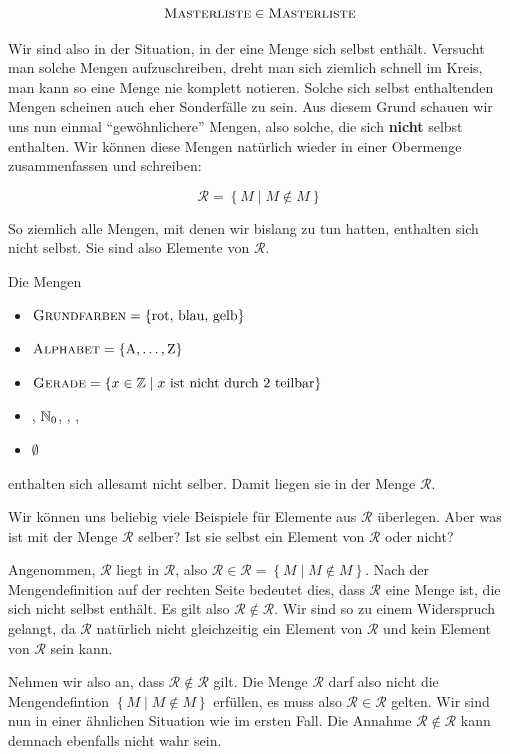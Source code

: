 \documentclass[../../main.tex]{subfiles}
\newcommand{\R}{\ensuremath{\mathcal{R}}\xspace}
\begin{document}
$$\textsc{Masterliste} \in \textsc{Masterliste}$$


Wir sind also in der Situation, in der eine Menge sich selbst enthält. Versucht man solche Mengen aufzuschreiben, dreht man sich ziemlich schnell im Kreis, man kann so eine Menge nie komplett notieren. Solche sich selbst enthaltenden Mengen scheinen auch eher Sonderfälle zu sein. Aus diesem Grund schauen wir uns nun einmal \enquote{gewöhnlichere} Mengen, also solche, die sich \textbf{nicht} selbst enthalten. Wir können diese Mengen natürlich wieder in einer Obermenge zusammenfassen und schreiben:

$$\R = \left\{ M \mid M \notin M \right\}$$

So ziemlich alle Mengen, mit denen wir bislang zu tun hatten, enthalten sich nicht selbst. Sie sind also Elemente von \R.

\begin{example}{}
	Die Mengen
	\begin{itemize}
		\item $\textsc{Grundfarben} = \left\{\text{rot, blau, gelb}\right\}$
		\item $\textsc{Alphabet} = \left\{\text{A},\ldots,\text{Z}\right\}$
		\item $\textsc{Gerade} = \left\{x \in \mathbb{Z} \mid x \text{ ist nicht durch 2 teilbar}\right\}$
		\item \Natural, $\mathbb{N}_0$, \Integer, \Rational, \Real
		\item $\emptyset$
	\end{itemize}
	enthalten sich allesamt nicht selber. Damit liegen sie in der Menge \R.
\end{example}

Wir können uns beliebig viele Beispiele für Elemente aus \R überlegen. Aber was ist mit der Menge \R selber? Ist sie selbst ein Element von \R oder nicht?

Angenommen, \R liegt in \R, also $\R \in \R = \left\{ M \mid M \notin M \right\}$. Nach der Mengendefinition auf der rechten Seite bedeutet dies, dass \R eine Menge ist, die sich nicht selbst enthält. Es gilt also $\R \notin \R$. Wir sind so zu einem Widerspruch gelangt, da \R natürlich nicht gleichzeitig ein Element von \R und kein Element von \R sein kann.

Nehmen wir also an, dass $\R \notin \R$ gilt. Die Menge \R darf also nicht die Mengendefintion $\left\{ M \mid M \notin M \right\}$ erfüllen, es muss also $\R \in \R$ gelten. Wir sind nun in einer ähnlichen Situation wie im ersten Fall. Die Annahme $\R \notin \R$ kann demnach ebenfalls nicht wahr sein.
\end{document}
